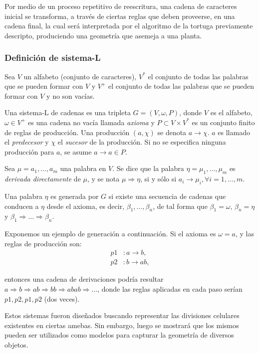 Por medio de un proceso repetitivo de reescritura, una cadena de caracteres inicial se transforma, a través de ciertas reglas que deben proveerse, en una cadena final, la cual será interpretada por el algoritmo de la tortuga previamente descripto, produciendo una geometría que asemeja a una planta.

\subsubsection{Definición de sistema-L}
Sea $V$ un alfabeto (conjunto de caracteres), $V^{*}$ el conjunto de todas las palabras que se pueden formar con $V$ y $V^{+}$ el conjunto de todas las palabras que se pueden formar con $V$ y no son vacías.

Una sistema-L de cadenas es una tripleta $G = (V,\omega,P)$, donde $V$ es el alfabeto, $\omega \in V^{+}$ es una cadena no vacía llamada {\em axioma} y $P \subset V \times V^{*}$ es un conjunto finito de reglas de producción.
Una producción $(a,\chi)$ se denota $a \rightarrow \chi$.
$a$ es llamado el {\em predecesor} y $\chi$ el {\em sucesor} de la producción.
Si no se especifica ninguna producción para $a$, se asume $a \rightarrow a \in P$.

Sea $\mu = a_{1}, \dots, a_{m}$ una palabra en $V$.
Se dice que la palabra $\eta = \mu_{1}, \dots, \mu_{m}$ es {\em derivada directamente} de $\mu$, y se nota $\mu \Rightarrow \eta$,  si y sólo si $a_{i} \rightarrow \mu_{i}, \forall i = 1, \dots, m$.

Una palabra $\eta$ es generada por $G$ si existe una secuencia de cadenas que conducen a $\eta$ desde el axioma, es decir, $\beta_{1},\dots,\beta_{n}$, de tal forma que $\beta_{1} = \omega$, $\beta_{n} = \eta$ y $\beta_{1} \Rightarrow \dots  \Rightarrow \beta_{n}$.

Exponemos un ejemplo de generación a continuación.
Si el axioma es $\omega = a$, y las reglas de producción son:
\begin{align*}
p1 &: a \rightarrow b,\\
p2 &: b \rightarrow ab,
\end{align*}

entonces una cadena de derivaciones podría resultar $a \Rightarrow b \Rightarrow ab \Rightarrow bb \Rightarrow abab \Rightarrow \dots$, donde las reglas aplicadas en cada paso serían $p1, p2, p1, p2$ (dos veces).

Estos sistemas fueron diseñados buscando representar las divisiones celulares existentes en ciertas amebas.
Sin embargo, luego se mostrará que los mismos pueden ser utilizados como modelos para capturar la geometría de diversos objetos.

